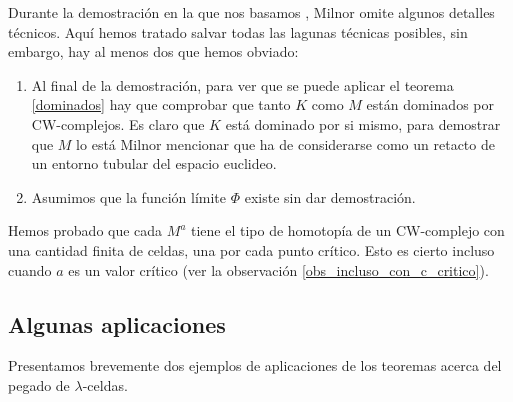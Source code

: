 \begin{remark}
    Durante la demostración en la que nos basamos \cite[p.~23]{milnor1963}, Milnor omite algunos detalles técnicos. Aquí hemos tratado salvar todas las lagunas técnicas posibles, sin embargo, hay al menos dos que hemos obviado:
    \begin{enumerate}[label=(\roman*)]
        \item Al final de la demostración, para ver que se puede aplicar el teorema \ref{dominados} hay que comprobar que tanto $K$ como $M$ están dominados por CW-complejos. Es claro que $K$ está dominado por si mismo, para demostrar que $M$ lo está Milnor mencionar que ha de considerarse como un retacto de un entorno tubular del espacio euclideo.
        \item Asumimos que la función límite $\Phi$ existe sin dar demostración.
    \end{enumerate}    
\end{remark}

\begin{remark}
    Hemos probado que cada $M^a$ tiene el tipo de homotopía de un CW-complejo con una cantidad finita de celdas, una por cada punto crítico. Esto es cierto incluso cuando $a$ es un valor crítico (ver la observación \ref{obs_incluso_con_c_critico}).
\end{remark}

\subsection{Algunas aplicaciones}
\label{subsec:aplicaciones}
Presentamos brevemente dos ejemplos de aplicaciones de los teoremas acerca del pegado de $\lambda$-celdas.

